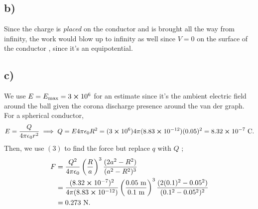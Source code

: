 \documentclass[
	12pt,
	]{article}
\newcommand{\ep}{\epsilon}
\theoremstyle{definition}
\theoremstyle{definition}
\theoremstyle{definition}
\theoremstyle{definition}
\theoremstyle{definition}
\theoremstyle{example}
\theoremstyle{note}
\theoremstyle{remark}
\theoremstyle{example}
\begin{document}
		\subsection*{b) }
			Since the charge is \textit{placed} on the conductor and is brought all the way from infinity, the work would blow up to infinity as well since $V=0$ on the surface of the conductor , since it's an equipotential.
		\subsection*{c) }
			We use $E=E_{\text{max}} = 3 \cross 10^{6}$ for an estimate since it's the ambient electric field around the ball given the corona discharge presence around the van der graph. For a spherical conductor, 
			$$ E = \frac{Q}{4 \pi \ep_{0}r^{2}} \implies Q = E 4 \pi \ep_{0}R^{2} = (3 \cross 10^{6})4 \pi (8.83\cross 10^{-12}) (0.05)^{2} = 8.32 \cross 10^{-7} \ \si{\coulomb}.$$
			Then, we use $(3)$ to find the force but replace $q $ with $Q$ ; 
			\begin{align*}
				F &= \frac{Q^{2}}{4 \pi \ep_{0}} \left(\frac{R}{a}\right)^{3} \frac{(2a^{2} -R^{2})}{(a^{2} -R^{2})^{3}} \\
				&=\frac{(8.32 \cross 10^{-7})^{2}}{4 \pi (8.83 \cross 10^{-12})} \left(\frac{0.05 \ \si{\meter}}{0.1 \ \si{\meter}}\right)^{3} \frac{(2(0.1)^{2} - 0.05^{2})}{(0.1^{2} -0.05^{2})^{2}} \\
				&= 0.273 \ \si{\newton}.
			\end{align*}
	
\end{document}

